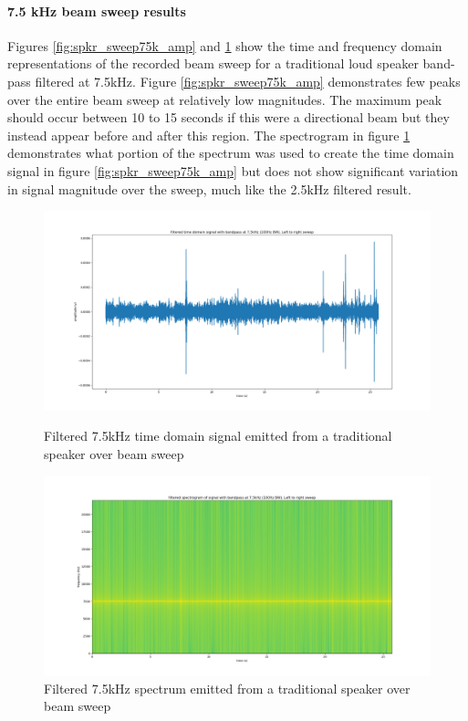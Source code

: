 \newpage
\paragraph{7.5 kHz beam sweep results}

Figures \ref{fig:spkr_sweep75k_amp} and \ref{fig:spkr_sweep75k_spectro} show the time and frequency domain representations of the recorded beam sweep for a traditional loud speaker band-pass filtered at 7.5kHz. Figure \ref{fig:spkr_sweep75k_amp} demonstrates few peaks over the entire beam sweep at relatively low magnitudes. The maximum peak should occur between 10 to 15 seconds if this were a directional beam but they instead appear before and after this region. The spectrogram in figure \ref{fig:spkr_sweep75k_spectro} demonstrates what portion of the spectrum was used to create the time domain signal in figure \ref{fig:spkr_sweep75k_amp} but does not show significant variation in signal magnitude over the sweep, much like the 2.5kHz filtered result.
\begin{figure}[ht!]
    \centering
    \begin{minipage}{0.49\textwidth}
        \centering
        \includegraphics[width=\textwidth]{Figures/Testing/BeamSweep/Classical_speaker/7_5k_amp_sweep_spkr.png}
        \caption{Filtered 7.5kHz time domain signal emitted from a traditional speaker over beam sweep}
        \label{fig:spkr_sweep75k_amp}
    \end{minipage}\hfill
    \begin{minipage}{0.49\textwidth}
        \centering
        \includegraphics[width=\textwidth]{Figures/Testing/BeamSweep/Classical_speaker/7_5k_freq_sweep_spkr.png}
        \caption{Filtered 7.5kHz spectrum emitted from a traditional speaker over beam sweep}
        \label{fig:spkr_sweep75k_spectro}
    \end{minipage}
\end{figure}


